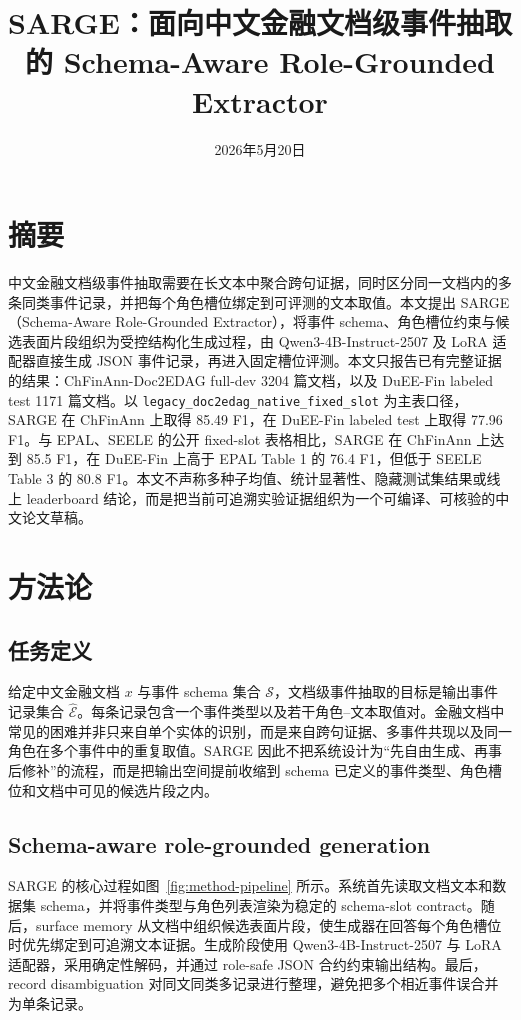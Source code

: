 \documentclass[UTF8,fontset=none,11pt]{ctexart}
\title{SARGE：面向中文金融文档级事件抽取的 Schema-Aware Role-Grounded Extractor}
\author{}
\date{2026年5月20日}
\begin{document}
\maketitle

\section{摘要}

中文金融文档级事件抽取需要在长文本中聚合跨句证据，同时区分同一文档内的多条同类事件记录，并把每个角色槽位绑定到可评测的文本取值。本文提出 SARGE（Schema-Aware Role-Grounded Extractor），将事件 schema、角色槽位约束与候选表面片段组织为受控结构化生成过程，由 Qwen3-4B-Instruct-2507 及 LoRA 适配器直接生成 JSON 事件记录，再进入固定槽位评测。本文只报告已有完整证据的结果：ChFinAnn-Doc2EDAG full-dev 3204 篇文档，以及 DuEE-Fin labeled test 1171 篇文档。以 \texttt{legacy\_doc2edag\_native\_fixed\_slot} 为主表口径，SARGE 在 ChFinAnn 上取得 85.49 F1，在 DuEE-Fin labeled test 上取得 77.96 F1。与 EPAL、SEELE 的公开 fixed-slot 表格相比，SARGE 在 ChFinAnn 上达到 85.5 F1，在 DuEE-Fin 上高于 EPAL Table 1 的 76.4 F1，但低于 SEELE Table 3 的 80.8 F1。本文不声称多种子均值、统计显著性、隐藏测试集结果或线上 leaderboard 结论，而是把当前可追溯实验证据组织为一个可编译、可核验的中文论文草稿。

\section{方法论}

\subsection{任务定义}

给定中文金融文档 $x$ 与事件 schema 集合 $\mathcal{S}$，文档级事件抽取的目标是输出事件记录集合 $\hat{\mathcal{E}}$。每条记录包含一个事件类型以及若干角色--文本取值对。金融文档中常见的困难并非只来自单个实体的识别，而是来自跨句证据、多事件共现以及同一角色在多个事件中的重复取值。SARGE 因此不把系统设计为“先自由生成、再事后修补”的流程，而是把输出空间提前收缩到 schema 已定义的事件类型、角色槽位和文档中可见的候选片段之内。

\subsection{Schema-aware role-grounded generation}

SARGE 的核心过程如图~\ref{fig:method-pipeline} 所示。系统首先读取文档文本和数据集 schema，并将事件类型与角色列表渲染为稳定的 schema-slot contract。随后，surface memory 从文档中组织候选表面片段，使生成器在回答每个角色槽位时优先绑定到可追溯文本证据。生成阶段使用 Qwen3-4B-Instruct-2507 与 LoRA 适配器，采用确定性解码，并通过 role-safe JSON 合约约束输出结构。最后，record disambiguation 对同文同类多记录进行整理，避免把多个相近事件误合并为单条记录。
\end{document}
